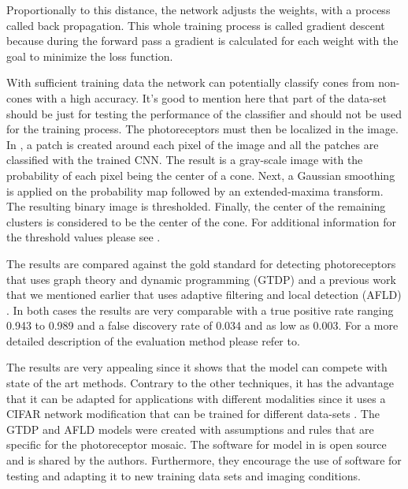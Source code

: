 \documentclass[]{article}
\begin{document}
Proportionally to this distance, the network adjusts the weights, with a process called back propagation.
This whole training process is called gradient descent because during the forward pass a gradient is calculated 
for each weight with the goal to minimize the loss function.

With sufficient training data the network can potentially classify cones from non-cones with a high accuracy.
It's good to mention here that part of the data-set should be just for testing the performance of the classifier and should not be used for the training process.
The photoreceptors must then be localized in the image.
In \cite{cunefare_open_2017}, a patch is created around each pixel of the image and all the patches are classified
with the trained CNN.
The result is a gray-scale image with the probability of each pixel being the center of a cone.
Next, a Gaussian smoothing is applied on the probability map followed by an extended-maxima transform.
The resulting binary image is thresholded.
Finally, the center of the remaining clusters is considered to be the center of the cone.
For additional information for the threshold values please see \cite{cunefare_open_2017}.

The results are compared against the gold standard for detecting photoreceptors that uses graph theory and dynamic programming (GTDP) and a previous work
that we mentioned earlier that uses adaptive filtering and local detection (AFLD) \cite{cunefare_automatic_2016}.
In both cases the  results are very comparable with a true positive rate ranging 0.943 to 0.989 and a false discovery rate of 0.034 and as low as 0.003.
For a more detailed description of the evaluation method please refer to\cite{cunefare_open_2017}.

The results are very appealing since it shows that the model can compete with state of the art methods.
Contrary to the other techniques, it has the advantage that it can be adapted for applications with different modalities since it uses a CIFAR network modification that can be trained for different data-sets .
The GTDP and AFLD models were created with assumptions and rules that are specific for the 
photoreceptor mosaic.
The software for  model in\cite{cunefare_automatic_2016} is open source and is shared by the authors.
Furthermore, they encourage the use of software for testing and adapting it to new training data sets and imaging conditions.
\end{document}
